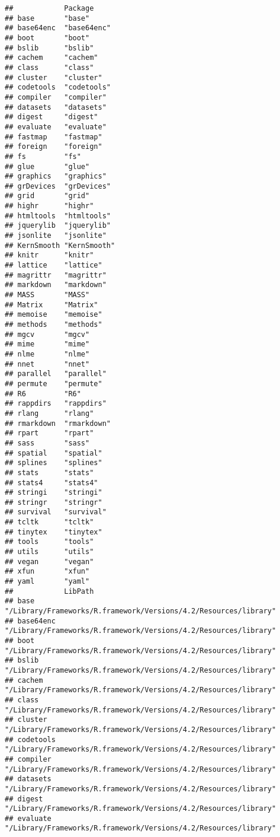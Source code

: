 \documentclass[
]{article}
\begin{document}
\begin{verbatim}
##            Package     
## base       "base"      
## base64enc  "base64enc" 
## boot       "boot"      
## bslib      "bslib"     
## cachem     "cachem"    
## class      "class"     
## cluster    "cluster"   
## codetools  "codetools" 
## compiler   "compiler"  
## datasets   "datasets"  
## digest     "digest"    
## evaluate   "evaluate"  
## fastmap    "fastmap"   
## foreign    "foreign"   
## fs         "fs"        
## glue       "glue"      
## graphics   "graphics"  
## grDevices  "grDevices" 
## grid       "grid"      
## highr      "highr"     
## htmltools  "htmltools" 
## jquerylib  "jquerylib" 
## jsonlite   "jsonlite"  
## KernSmooth "KernSmooth"
## knitr      "knitr"     
## lattice    "lattice"   
## magrittr   "magrittr"  
## markdown   "markdown"  
## MASS       "MASS"      
## Matrix     "Matrix"    
## memoise    "memoise"   
## methods    "methods"   
## mgcv       "mgcv"      
## mime       "mime"      
## nlme       "nlme"      
## nnet       "nnet"      
## parallel   "parallel"  
## permute    "permute"   
## R6         "R6"        
## rappdirs   "rappdirs"  
## rlang      "rlang"     
## rmarkdown  "rmarkdown" 
## rpart      "rpart"     
## sass       "sass"      
## spatial    "spatial"   
## splines    "splines"   
## stats      "stats"     
## stats4     "stats4"    
## stringi    "stringi"   
## stringr    "stringr"   
## survival   "survival"  
## tcltk      "tcltk"     
## tinytex    "tinytex"   
## tools      "tools"     
## utils      "utils"     
## vegan      "vegan"     
## xfun       "xfun"      
## yaml       "yaml"      
##            LibPath                                                         
## base       "/Library/Frameworks/R.framework/Versions/4.2/Resources/library"
## base64enc  "/Library/Frameworks/R.framework/Versions/4.2/Resources/library"
## boot       "/Library/Frameworks/R.framework/Versions/4.2/Resources/library"
## bslib      "/Library/Frameworks/R.framework/Versions/4.2/Resources/library"
## cachem     "/Library/Frameworks/R.framework/Versions/4.2/Resources/library"
## class      "/Library/Frameworks/R.framework/Versions/4.2/Resources/library"
## cluster    "/Library/Frameworks/R.framework/Versions/4.2/Resources/library"
## codetools  "/Library/Frameworks/R.framework/Versions/4.2/Resources/library"
## compiler   "/Library/Frameworks/R.framework/Versions/4.2/Resources/library"
## datasets   "/Library/Frameworks/R.framework/Versions/4.2/Resources/library"
## digest     "/Library/Frameworks/R.framework/Versions/4.2/Resources/library"
## evaluate   "/Library/Frameworks/R.framework/Versions/4.2/Resources/library"

\end{verbatim}
\end{document}
